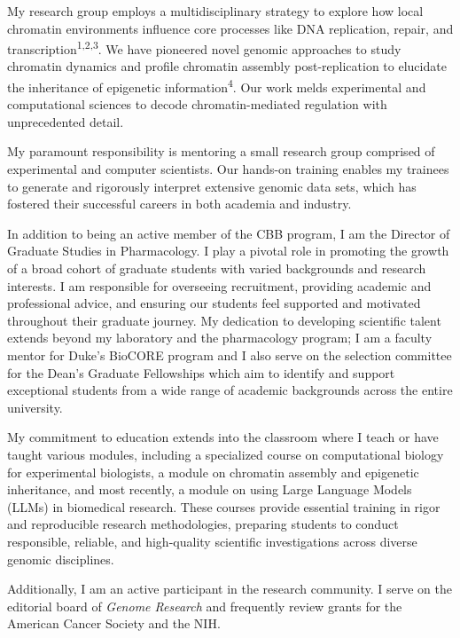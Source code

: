 \begin{statement}
My research group employs a multidisciplinary strategy to explore how local chromatin environments influence core processes like DNA replication, repair, and transcription\textsuperscript{1,2,3}. We have pioneered novel genomic approaches to study chromatin dynamics and profile chromatin assembly post-replication to elucidate the inheritance of epigenetic information\textsuperscript{4}. Our work melds experimental and computational sciences to decode chromatin-mediated regulation with unprecedented detail.

My paramount responsibility is mentoring a small research group comprised of experimental and computer scientists. Our hands-on training enables my trainees to generate and rigorously interpret extensive genomic data sets, which has fostered their successful careers in both academia and industry.

In addition to being an active member of the CBB program, I am the Director of Graduate Studies in Pharmacology.  I play a pivotal role in promoting the growth of a broad cohort of graduate students with varied backgrounds and research interests. I am responsible for overseeing recruitment, providing academic and professional advice, and ensuring our students feel supported and motivated throughout their graduate journey. My dedication to developing scientific talent extends beyond my laboratory and the pharmacology program; I am a faculty mentor for Duke's BioCORE program and I also serve on the selection committee for the Dean's Graduate Fellowships which aim to identify and support exceptional students from a wide range of academic backgrounds across the entire university.

My commitment to education extends into the classroom where I teach or have taught various modules, including a specialized course on computational biology for experimental biologists, a module on chromatin assembly and epigenetic inheritance, and most recently, a module on using Large Language Models (LLMs) in biomedical research. These courses provide essential training in rigor and reproducible research methodologies, preparing students to conduct responsible, reliable, and high-quality scientific investigations across diverse genomic disciplines.

Additionally, I am an active participant in the research community. I serve on the editorial board of \textit{Genome Research} and frequently review grants for the American Cancer Society and the NIH.  


\end{statement}
